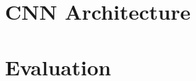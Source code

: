 \documentclass{report}
\begin{document}
  

  \tableofcontents{}
  \printindex{}

  \chapter{CNN Architecture}

  \chapter{Evaluation}

  
  
  \printindex
\end{document}
